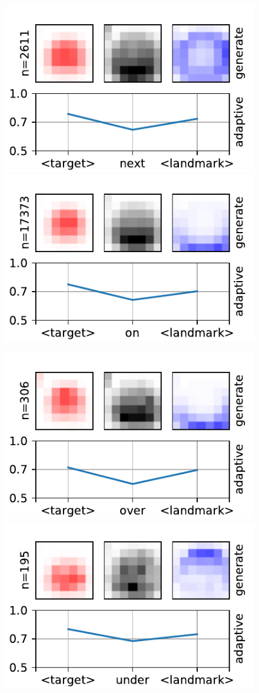 \begin{figure}[ht!]
	\centering
	\includegraphics[width=0.4\columnwidth]{studies/sivl2018/figures/next-adaptive.pdf}
	\includegraphics[width=0.4\columnwidth]{studies/sivl2018/figures/on-adaptive.pdf}
\end{figure}
\begin{figure}[ht!]
	\centering
	\includegraphics[width=0.4\columnwidth]{studies/sivl2018/figures/over-adaptive.pdf}
	\includegraphics[width=0.4\columnwidth]{studies/sivl2018/figures/under-adaptive.pdf}
\end{figure}


\clearpage


